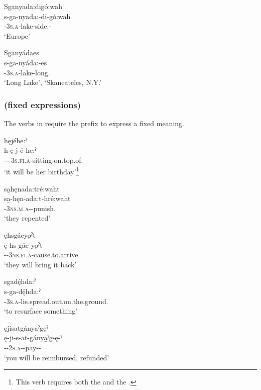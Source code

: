 \ex Sganyada:digó:wah\\
\gll s-ga-nyada:-di-gó:wah\\
{\repetitive}-\textsc{3s.a}-lake-side.{\stative}-{\augmentative}\\
\glt `Europe'

\ex Sganyádaes \\
\gll s-ga-nyáda:-es\\
{\repetitive}-\textsc{3s.a}-lake-long.{\stative}\\
\glt ‘Long Lake’, `Skaneateles, N.Y.'
\z
\z


\subsubsection*{ (fixed expressions)} \label{[s-, j-, ji-verb] (fixed expressions)}
The verbs in  require the  {\repetitive} prefix to express a fixed meaning.

\ea\label{ex:srepex4}

\ea hęjéhe:ˀ\\
\gll h-ę-j-é-he:ˀ\\
{\translocative}-{\future}-{\repetitive}-\textsc{3s.fi.a}-sitting.on.top.of.{\punctual}\\
\glt `it will be her birthday'\footnote{This verb requires both the {\translocative} and the {\repetitive}.}

\ex sa̱hęnada:tré:waht\\
\gll sa̱-hęn-ada:t-hré:waht\\
{\repetitive}-\textsc{3ns.m.a}-{}-punish.{\zeropunctual}\\
\glt `they repented'

\largerpage
\ex ęhsgáeyǫˀt\\
\gll ę-hs-gáe-yǫˀt\\
\fut-{\repetitive}-\textsc{3ns.fi.a}-cause.to.arrive.{\zeropunctual}\\
\glt `they will bring it back'

\ex sgadę́hda:ˀ\\
\gll s-ga-dę́hda:ˀ\\
{\repetitive}-\textsc{3s.a}-lie.spread.out.on.the.ground.{\stative}\\
\glt `to resurface something'

\ex ęjisatgánya̱ˀgęˀ\\
\gll ę-ji-s-at-gánya̱ˀg-ę-ˀ\\
\fut-{\repetitive}-\textsc{2s.a}-{\semireflexive}-pay-{\benefactive}-{\punctual}\\
\glt `you will be reimbursed, refunded'


